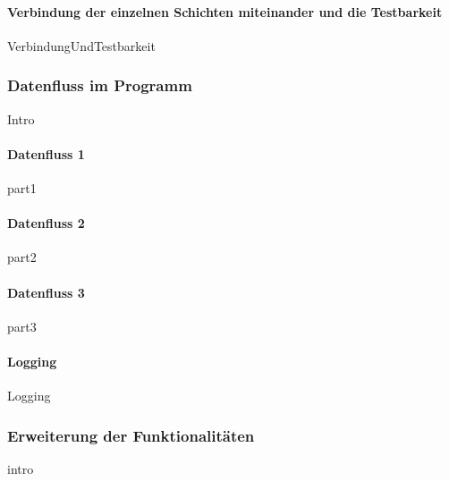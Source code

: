 \documentclass{article}
\begin{document}
            \paragraph{Verbindung der einzelnen Schichten miteinander und die Testbarkeit}
                {VerbindungUndTestbarkeit}

           
               
        \newpage
        \subsubsection{Datenfluss im Programm}
        \label{kap:Dataflow}
            {Intro}
           
            \newpage
            \paragraph{Datenfluss \textbf{1}}
            {part1}
            \newpage
            \paragraph{Datenfluss \textbf{2}}
            {part2}
            \newpage
            \paragraph{Datenfluss \textbf{3}}
            {part3} 

   \newpage
            \paragraph{Logging}
                {Logging}


        \newpage
        \subsubsection{Erweiterung der Funktionalitäten}
            {intro}
    
\end{document}
